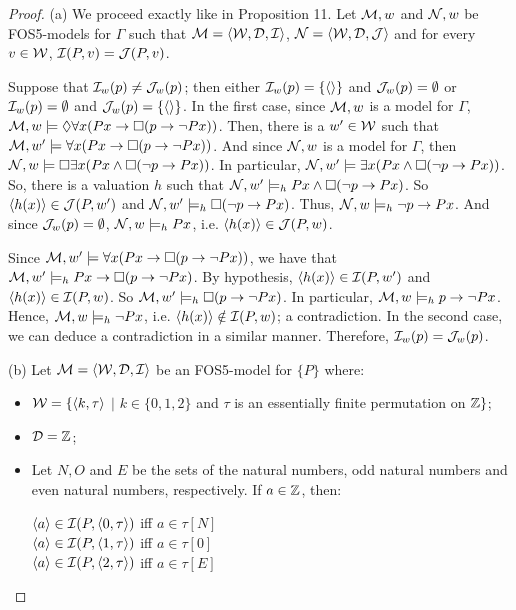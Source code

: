 \begin{proof}
(a) We proceed exactly like in Proposition 11. Let $\mathcal{M},w$ and $\mathcal{N},w$ be FOS5-models for $\Gamma$ such that $\mathcal{M} = \langle \mathcal{W},\mathcal{D},\mathcal{I}\rangle$, $\mathcal{N} = \langle \mathcal{W},\mathcal{D},\mathcal{J}\rangle$ and for every $v \in \mathcal{W}$, $\mathcal{I}(P,v) = \mathcal{J}(P,v)$. 

\qquad Suppose that $\mathcal{I}_{w}(p) \neq \mathcal{J}_{w}(p)$; then either $\mathcal{I}_{w}(p) = \{ \langle \rangle\}$ and $\mathcal{J}_{w}(p) = \emptyset$ or 
$\mathcal{I}_{w}(p) = \emptyset$ and $\mathcal{J}_{w}(p) =  \{\langle \rangle\}$. In the first case, since $\mathcal{M}, w$ is a model for $\Gamma$, $\mathcal{M}, w \models \Diamond\forall x (Px \rightarrow \Box (p \rightarrow \neg Px))$. Then, there is a $w^{\prime} \in \mathcal{W}$ such that $\mathcal{M}, w^{\prime} \models \forall x (Px \rightarrow \Box (p \rightarrow \neg Px))$. And since $\mathcal{N}, w$ is a model for $\Gamma$, then $\mathcal{N}, w \models  \Box \exists x (Px \wedge \Box (\neg p \rightarrow Px))$. In particular, $\mathcal{N}, w^{\prime} \models \exists x (Px \wedge \Box (\neg p \rightarrow Px))$. So, there is a valuation $h$ such that $\mathcal{N}, w^{\prime} \models_{h}  Px \wedge \Box (\neg p \rightarrow Px)$. So $\langle h(x) \rangle \in \mathcal{J}(P,w^{\prime})$ and $\mathcal{N}, w^{\prime} \models_{h} \Box (\neg p \rightarrow Px)$. Thus, $\mathcal{N}, w \models_{h} \neg p \rightarrow Px$. And since $\mathcal{J}_{w}(p) = \emptyset$, $\mathcal{N}, w \models_{h} Px$, i.e. $\langle h(x) \rangle \in \mathcal{J}(P,w)$.   

\qquad  Since $\mathcal{M}, w^{\prime} \models \forall x (Px \rightarrow \Box (p \rightarrow \neg Px))$, we have that $\mathcal{M}, w^{\prime} \models_{h} Px \rightarrow \Box (p \rightarrow \neg Px)$. By hypothesis, $\langle h(x) \rangle \in \mathcal{I}(P,w^{\prime})$ and $\langle h(x) \rangle \in \mathcal{I}(P,w)$. So $\mathcal{M}, w^{\prime} \models_{h} \Box (p \rightarrow \neg Px)$. In particular, $\mathcal{M}, w \models_{h} p \rightarrow \neg Px$. Hence, $\mathcal{M}, w \models_{h} \neg Px$, i.e. $\langle h(x) \rangle \notin \mathcal{I}(P,w)$; a contradiction. In the second case, we can deduce a contradiction in a similar manner. Therefore, $\mathcal{I}_{w}(p) = \mathcal{J}_{w}(p)$.

\qquad (b) Let $\mathcal{M} = \langle\mathcal{W},\mathcal{D},\mathcal{I}\rangle$ be an FOS5-model for $\{P\}$ where:
\begin{itemize}
\item $\mathcal{W} = \{ \langle k, \tau \rangle$ $|$ $k \in \{0,1,2\}$ and $\tau$ is an essentially finite permutation on $\mathbb{Z}\}$;
\item $\mathcal{D} = \mathbb{Z}$;
\item Let $N, O$ and $E$ be the sets of the natural numbers, odd natural numbers and even natural numbers, respectively. If $a \in \mathbb{Z}$, then:

\begin{center}
$\langle a \rangle \in \mathcal{I}(P,\langle 0,\tau \rangle)$ iff $a \in \tau[N]$\\
$\langle a \rangle \in \mathcal{I}(P,\langle 1,\tau \rangle)$ iff $a \in \tau[0]$\\
$\langle a \rangle \in \mathcal{I}(P,\langle 2,\tau \rangle)$ iff $a \in \tau[E]$\\
\end{center}
\end{itemize}


\end{proof}

